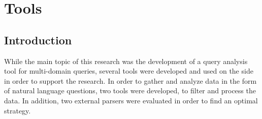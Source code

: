 \chapter{Tools} %
\label{cha:tools}

\section{Introduction} %
\label{sec:introduction_tools}
While the main topic of this research was the development of a query analysis tool for multi-domain queries, several tools were developed and used on the side in order to support the research. In order to gather and analyze data in the form of natural language questions, two tools were developed, to filter and process the data. In addition, two external parsers were evaluated in order to find an optimal strategy.


